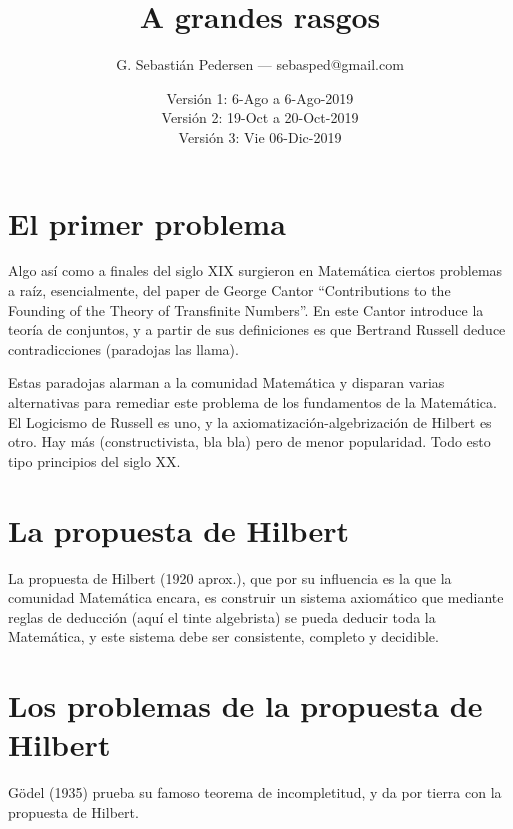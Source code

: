 \documentclass[a4paper,11pt]{article}
\title{A grandes rasgos}
\author{G. Sebastián Pedersen --- sebasped@gmail.com}
\date{Versión 1: 6-Ago a 6-Ago-2019\\
Versión 2: 19-Oct a 20-Oct-2019\\
Versión 3: Vie 06-Dic-2019}
\begin{document}
\maketitle


\section{El primer problema}
Algo así como a finales del siglo XIX surgieron en Matemática ciertos problemas a raíz, esencialmente, del paper de George Cantor ``Contributions to the Founding of the Theory of Transfinite Numbers''. En este Cantor introduce la teoría de conjuntos, y a partir de sus definiciones es que Bertrand Russell deduce contradicciones (paradojas las llama).

Estas paradojas alarman a la comunidad Matemática y disparan varias alternativas para remediar este problema de los fundamentos de la Matemática. El Logicismo de Russell es uno, y la axiomatización-algebrización de Hilbert es otro. Hay más (constructivista, bla bla) pero de menor popularidad. Todo esto tipo principios del siglo XX.

\section{La propuesta de Hilbert}
La propuesta de Hilbert (1920 aprox.), que por su influencia es la que la comunidad Matemática encara, es construir un sistema axiomático que mediante reglas de deducción (aquí el tinte algebrista) se pueda deducir toda la Matemática, y este sistema debe ser consistente, completo y decidible.

\section{Los problemas de la propuesta de Hilbert}
Gödel (1935) prueba su famoso teorema de incompletitud, y da por tierra con la propuesta de Hilbert.
\end{document}
